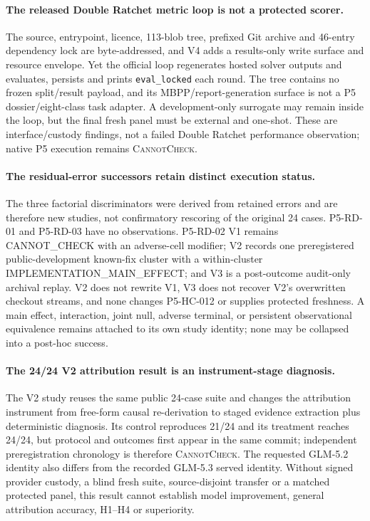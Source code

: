 \paragraph{The released Double Ratchet metric loop is not a protected scorer.}
The source, entrypoint, licence, 113-blob tree, prefixed Git archive and
46-entry dependency lock are byte-addressed, and V4 adds a results-only write
surface and resource envelope. Yet the official loop regenerates hosted solver
outputs and evaluates, persists and prints \texttt{eval\_locked} each round.
The tree contains no frozen split/result payload, and its MBPP/report-generation
surface is not a P5 dossier/eight-class task adapter. A development-only
surrogate may remain inside the loop, but the final fresh panel must be external
and one-shot. These are interface/custody findings, not a failed Double Ratchet
performance observation; native P5 execution remains \textsc{CannotCheck}.

\paragraph{The residual-error successors retain distinct execution status.}
The three factorial discriminators were derived from retained errors and are
therefore new studies, not confirmatory rescoring of the original 24 cases.
P5-RD-01 and P5-RD-03 have no observations. P5-RD-02 V1 remains
\textsf{CANNOT\_CHECK} with an adverse-cell modifier; V2 records one
preregistered public-development known-fix cluster with a within-cluster
\textsf{IMPLEMENTATION\_MAIN\_EFFECT}; and V3 is a post-outcome audit-only
archival replay. V2 does not rewrite V1, V3 does not recover V2's overwritten
checkout streams, and none changes P5-HC-012 or supplies protected freshness.
A main effect, interaction, joint null, adverse terminal, or persistent
observational equivalence remains attached to its own study identity; none may
be collapsed into a post-hoc success.

\paragraph{The 24/24 V2 attribution result is an instrument-stage diagnosis.}
The V2 study reuses the same public 24-case suite and changes the attribution
instrument from free-form causal re-derivation to staged evidence extraction
plus deterministic diagnosis. Its control reproduces 21/24 and its treatment
reaches 24/24, but protocol and outcomes first appear in the same commit;
independent preregistration chronology is therefore \textsc{CannotCheck}.
The requested GLM-5.2 identity also differs from the recorded GLM-5.3 served
identity. Without signed provider custody, a blind fresh suite, source-disjoint
transfer or a matched protected panel, this result cannot establish model
improvement, general attribution accuracy, H1--H4 or superiority.

